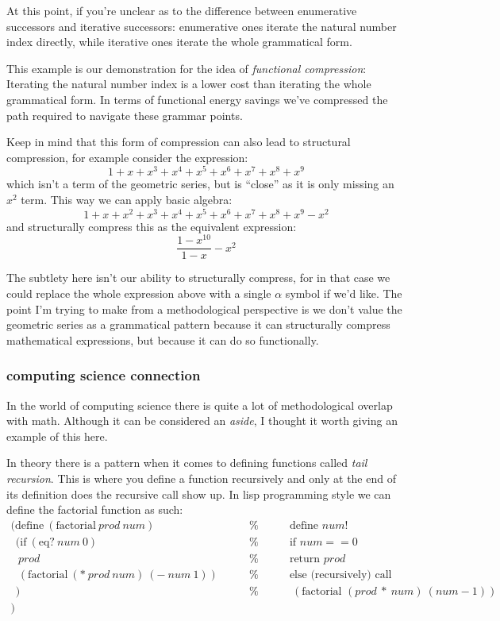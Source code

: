 \documentclass[twoside]{article}
\begin{document}
At this point, if you're unclear as to the difference between enumerative successors and iterative successors:
enumerative ones iterate the natural number index directly, while iterative ones iterate the whole grammatical form.

This example is our demonstration for the idea of \emph{functional compression}: Iterating the natural number index
is a lower cost than iterating the whole grammatical form. In terms of functional energy savings we've compressed
the path required to navigate these grammar points.

Keep in mind that this form of compression can also lead to structural compression, for example consider the expression:
$$ 1+x+x^3+x^4+x^5+x^6+x^7+x^8+x^9 $$
which isn't a term of the geometric series, but is ``close'' as it is only missing an $ x^2 $ term. This way we
can apply basic algebra:
$$ 1+x+x^2+x^3+x^4+x^5+x^6+x^7+x^8+x^9-x^2 $$
and structurally compress this as the equivalent expression:
$$ \frac{1-x^{10}}{1-x}-x^2 $$

The subtlety here isn't our ability to structurally compress, for in that case we could replace the whole expression
above with a single $ \alpha $ symbol if we'd like. The point I'm trying to make from a methodological perspective
is we don't value the geometric series as a grammatical pattern because it can structurally compress mathematical
expressions, but because it can do so functionally.

\subsubsection*{computing science connection}

In the world of computing science there is quite a lot of methodological overlap with math. Although it can be considered
an \emph{aside}, I thought it worth giving an example of this here.

In theory there is a pattern when it comes to defining functions called \emph{tail recursion}. This is where you define
a function recursively and only at the end of its definition does the recursive call show up. In lisp programming style
we can define the factorial function as such:
$$ \begin{array}{lrl}
(\mbox{define}\ (\mbox{factorial}\ prod\ num)			& \qquad\%\qquad & \mbox{define } num!					\\
\ \ (\mbox{if}\ (\mbox{eq?}\ num\ 0)				& \qquad\%\qquad & \mbox{if } num == 0					\\
\ \           \ prod						& \qquad\%\qquad & \mbox{return } prod					\\
\ \           \ (\mbox{factorial}\ (*\ prod\ num)\ (-\ num\ 1))	& \qquad\%\qquad & \mbox{else (recursively) call }			\\
\ \ )								& \qquad\%\qquad & \ (\mbox{factorial } (prod\ *\ num)\ (num-1))	\\
)
\end{array} $$
\end{document}
